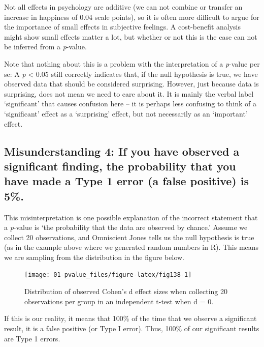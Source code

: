 \documentclass[
]{krantz}
\begin{document}
Not all effects in psychology are additive (we can not combine or transfer an increase in happiness of 0.04 scale points), so it is often more difficult to argue for the importance of small effects in subjective feelings. A cost-benefit analysis might show small effects matter a lot, but whether or not this is the case can not be inferred from a \emph{p}-value.

Note that nothing about this is a problem with the interpretation of a \emph{p}-value per se: A \emph{p} \textless{} 0.05 still correctly indicates that, if the null hypothesis is true, we have observed data that should be considered surprising. However, just because data is surprising, does not mean we need to care about it. It is mainly the verbal label `significant' that causes confusion here -- it is perhaps less confusing to think of a `significant' effect as a `surprising' effect, but not necessarily as an `important' effect.

\hypertarget{misconception4}{%
\subsection{Misunderstanding 4: If you have observed a significant finding, the probability that you have made a Type 1 error (a false positive) is 5\%.}\label{misconception4}}

This misinterpretation is one possible explanation of the incorrect statement that a \emph{p}-value is `the probability that the data are observed by chance.' Assume we collect 20 observations, and Omniscient Jones tells us the null hypothesis is true (as in the example above where we generated random numbers in R). This means we are sampling from the distribution in the figure below.

\begin{figure}

{\centering \texttt{[image: 01-pvalue\_files/figure-latex/fig138-1]} 

}

\caption{Distribution of observed Cohen's d effect sizes when collecting 20 observations per group in an independent t-test when d = 0.}\label{fig:fig138}
\end{figure}

If this is our reality, it means that 100\% of the time that we observe a significant result, it is a false positive (or Type I error). Thus, 100\% of our significant results are Type 1 errors.
\end{document}
